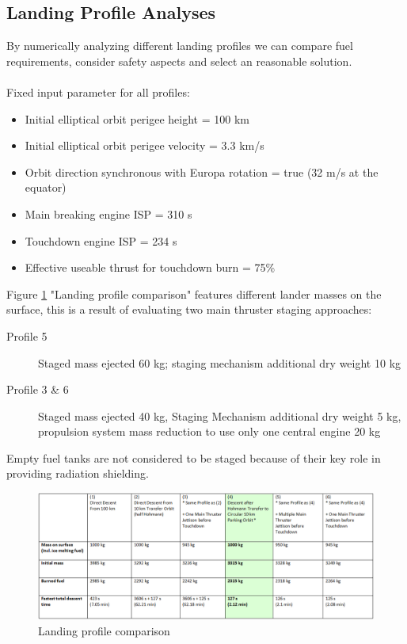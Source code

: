 \subsection{Landing Profile Analyses}\label{lapran}
By numerically analyzing different landing profiles we can compare fuel requirements, consider safety aspects and select an reasonable solution.\\
\\
Fixed input parameter for all profiles:
\begin{itemize} 
\item Initial elliptical orbit perigee height = 100 km
\item Initial elliptical orbit perigee velocity = 3.3 km/s
\item Orbit direction synchronous with Europa rotation = true (32 m/s at the equator)
\item Main breaking engine ISP = 310 s
\item Touchdown engine ISP = 234 s
\item Effective useable thrust for touchdown burn = 75\%
\end{itemize}

Figure \ref{fig:acomparison} "Landing profile comparison" features different lander masses on the surface, this is a result of evaluating two main thruster staging approaches: 
\begin{description}
\item [Profile 5] Staged mass ejected 60 kg; staging mechanism additional dry weight 10 kg
\item [Profile 3 \& 6] Staged mass ejected 40 kg, Staging Mechanism additional dry weight 5 kg, propulsion system mass reduction to use only one central engine 20 kg
\end{description}

Empty fuel tanks are not considered to be staged because of their key role in providing radiation shielding.

\begin{figure}[htb]
	\centering
	\includegraphics[width=\textwidth]{figures/Lander/aaroncomparison}
	\caption{Landing profile comparison\label{fig:acomparison}}
\end{figure}


